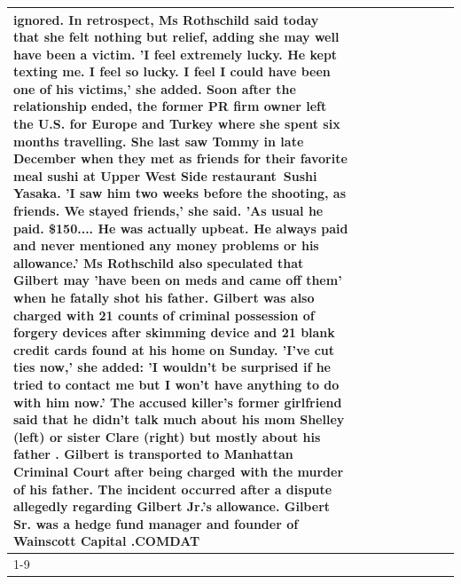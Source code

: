 \begin{table}[H]
\begin{tabular}{lllrlllll}
ignored. In retrospect, Ms Rothschild said today that she felt nothing but relief, adding she may well have been a victim. 'I feel extremely lucky. He kept texting me. I feel so lucky. I feel I could have been one of his victims,' she added. Soon after the relationship ended, the former PR firm owner left the U.S. for Europe and Turkey where she spent six months  travelling. She last saw Tommy in late December when they met as friends for their favorite meal sushi at Upper West Side restaurant Sushi Yasaka. 'I saw him two weeks before the shooting, as friends. We stayed friends,' she said. 'As usual he paid. \$150.... He was actually upbeat. He always paid and never mentioned any money problems or his allowance.' Ms Rothschild also speculated that Gilbert may 'have been on meds and came off them' when he fatally shot his father. Gilbert was also charged with 21 counts of criminal possession of forgery devices after skimming device and 21 blank credit cards found at his home on Sunday. 'I've cut ties now,' she added: 'I wouldn’t be surprised if he tried to contact me but I won’t have anything to do with him now.' The accused killer's former girlfriend said that he didn't talk much about his mom Shelley (left) or sister Clare (right) but mostly about his father . Gilbert is transported to Manhattan Criminal Court  after being charged with the murder of his father. The incident occurred after a dispute allegedly regarding Gilbert Jr.'s allowance. Gilbert Sr. was a hedge fund manager and founder of Wainscott Capital .COMDAT \\
\cline{1-9} \cline{2-9}

\end{tabular}
\end{table}

